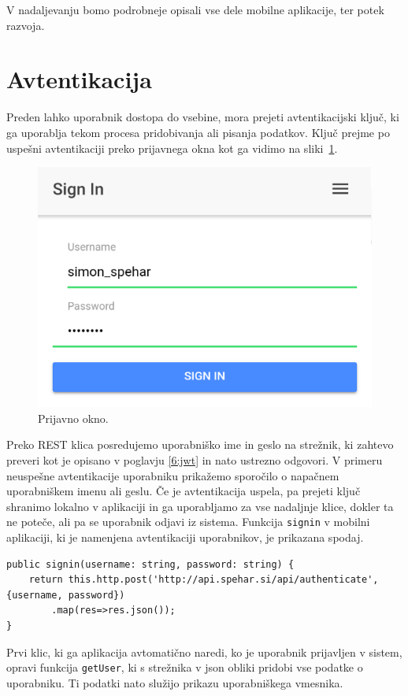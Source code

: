 \documentclass[a4paper, 12pt]{book}
\begin{document}
V nadaljevanju bomo podrobneje opisali vse dele mobilne aplikacije, ter potek razvoja.
\section{Avtentikacija}
Preden lahko uporabnik dostopa do vsebine, mora prejeti avtentikacijski ključ, ki ga uporablja tekom procesa pridobivanja ali pisanja podatkov. Ključ prejme po uspešni avtentikaciji preko prijavnega okna kot ga vidimo na sliki~\ref{mobile_login}.
\begin{figure}[H]
\centering
\includegraphics[height=0.45\textwidth]{slike/mobile_login}
\caption{Prijavno okno.}\label{mobile_login}
\end{figure}
\noindent Preko REST klica posredujemo uporabniško ime in geslo na strežnik, ki zahtevo preveri kot je opisano v poglavju \ref{6:jwt} in nato ustrezno odgovori. V primeru neuspešne avtentikacije uporabniku prikažemo sporočilo o napačnem uporabniškem imenu ali geslu. Če je avtentikacija uspela, pa prejeti ključ shranimo lokalno v aplikaciji in ga uporabljamo za vse nadaljnje klice, dokler ta ne poteče, ali pa se uporabnik odjavi iz sistema. Funkcija \texttt{signin} v mobilni aplikaciji, ki je namenjena avtentikaciji uporabnikov, je prikazana spodaj.
\begin{lstlisting}
public signin(username: string, password: string) {
    return this.http.post('http://api.spehar.si/api/authenticate', {username, password})
        .map(res=>res.json());
}
\end{lstlisting}
\bigskip
Prvi klic, ki ga aplikacija avtomatično naredi, ko je uporabnik prijavljen v sistem, opravi funkcija \texttt{getUser}, ki s strežnika v json obliki pridobi vse podatke o uporabniku. Ti podatki nato služijo prikazu uporabniškega vmesnika.
\end{document}
